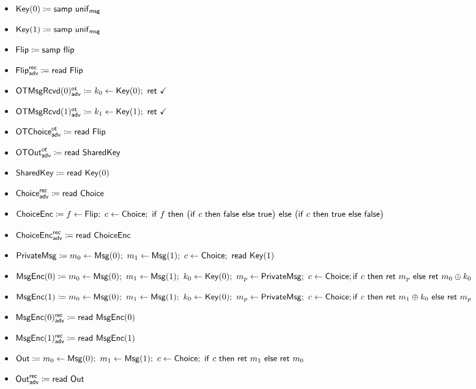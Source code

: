 \begin{itemize}
\item $\mathsf{Key}(0) \coloneqq \mathsf{samp} \ \mathsf{unif}_{\mathsf{msg}}$
\item {\color{red} $\mathsf{Key}(1) \coloneqq \mathsf{samp} \ \mathsf{unif}_{\mathsf{msg}}$}
\item $\mathsf{Flip} \coloneqq \mathsf{samp} \ \mathsf{flip}$
\item {\color{blue} $\mathsf{Flip}^{\mathsf{rec}}_{\mathsf{adv}} \coloneqq \mathsf{read} \ \mathsf{Flip}$}
\item {\color{blue} $\LeakOTMsgRcvd(0)^\ot_\adv \coloneqq k_0 \leftarrow \Key(0); \ \ret{\checkmark}$}
\item {\color{blue} $\LeakOTMsgRcvd(1)^\ot_\adv \coloneqq k_1 \leftarrow \Key(1); \ \ret{\checkmark}$}
\item {\color{blue} $\mathsf{OTChoice}^{\mathsf{ot}}_{\mathsf{adv}} \coloneqq \mathsf{read} \ \mathsf{Flip}$}
\item {\color{blue} $\mathsf{OTOut}^{\mathsf{ot}}_{\mathsf{adv}} \coloneqq \mathsf{read} \ \mathsf{SharedKey}$}
\item $\mathsf{SharedKey} \coloneqq \mathsf{read} \ \mathsf{Key}(0)$
\item {\color{blue} $\mathsf{Choice}^{\mathsf{rec}}_{\mathsf{adv}} \coloneqq \mathsf{read} \ \mathsf{Choice}$}
\item $\ChoiceEnc \coloneqq f \leftarrow \Flip; \ c \leftarrow \Choice; \ \ifte{f}{\big(\ifte{c}{\false}{\true}\big)}{\big(\ifte{c}{\true}{\false}\big)}$
\item {\color{blue} $\mathsf{ChoiceEnc}^{\mathsf{rec}}_{\mathsf{adv}} \coloneqq \mathsf{read} \ \mathsf{ChoiceEnc}$}
\item {\color{red} $\PrivateMsg \coloneqq m_0 \leftarrow \Msg(0); \ m_1 \leftarrow \Msg(1); \ c \leftarrow \Choice; \ \read{\Key(1)}$}
\item $\mathsf{MsgEnc}(0) \coloneqq m_0 \leftarrow \mathsf{Msg}(0); \ m_1 \leftarrow \mathsf{Msg}(1); \ k_0 \leftarrow \mathsf{Key}(0); \ m_p \leftarrow \mathsf{PrivateMsg}; \ c \leftarrow \mathsf{Choice}; \\ \mathsf{if} \ c \ \mathsf{then} \ \mathsf{ret} \ m_p \ \mathsf{else} \ \mathsf{ret} \ m_0 \oplus k_0$
\item $\mathsf{MsgEnc}(1) \coloneqq m_0 \leftarrow \mathsf{Msg}(0); \ m_1 \leftarrow \mathsf{Msg}(1); \ k_0 \leftarrow \mathsf{Key}(0); \ m_p \leftarrow \mathsf{PrivateMsg}; \ c \leftarrow \mathsf{Choice}; \\ \mathsf{if} \ c \ \mathsf{then} \ \mathsf{ret} \ m_1 \oplus k_0 \ \mathsf{else} \ \mathsf{ret} \ m_p$
\item {\color{blue} $\mathsf{MsgEnc}(0)^{\mathsf{rec}}_{\mathsf{adv}} \coloneqq \mathsf{read} \ \mathsf{MsgEnc}(0)$}
\item {\color{blue} $\mathsf{MsgEnc}(1)^{\mathsf{rec}}_{\mathsf{adv}} \coloneqq \mathsf{read} \ \mathsf{MsgEnc}(1)$}
\item $\Out \coloneqq m_0 \leftarrow \Msg(0); \ m_1 \leftarrow \Msg(1); \ c \leftarrow \Choice; \ \ifte{c}{\ret{m_1}}{\ret{m_0}}$
\item {\color{blue} $\mathsf{Out}^{\mathsf{rec}}_{\mathsf{adv}} \coloneqq \mathsf{read} \ \mathsf{Out}$}
\end{itemize}

